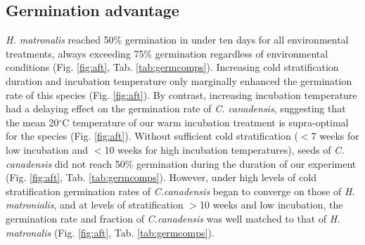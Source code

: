 \documentclass{article}[11pt]
\begin{document}
{\subsection*{Germination advantage}
\textit{H. matronalis} reached 50\% germination in under ten days for all environmental treatments, always exceeding 75\% germination regardless of environmental conditions (Fig. \ref{fig:aft}, Tab. \ref{tab:germcomps}). Increasing cold stratification duration and incubation temperature only marginally enhanced the germination rate of this species (Fig. \ref{fig:aft}). By contrast, increasing incubation temperature had a delaying effect on the germination rate of \textit{C. canadensis}, suggesting that the mean 20$^{\circ}$C temperature of our warm incubation treatment is supra-optimal for the species (Fig. \ref{fig:aft}). Without sufficient cold stratification ($<$7 weeks for low incubation and $<$10 weeks for high incubation temperatures), seeds of  \textit{C. canadensis} did not reach 50\% germination during the duration of our experiment (Fig. \ref{fig:aft}, Tab. \ref{tab:germcomps}). However, under high levels of cold stratification germination rates of \textit{C.canadensis} began to converge on those of \textit{H. matronialis}, and at levels of stratification $>$10 weeks and low incubation, the germination rate and fraction of \textit{C.canadensis} was well matched to that of \textit{H. matronalis} (Fig. \ref{fig:aft}, Tab. \ref{tab:germcomps}).
%

}
\end{document}
